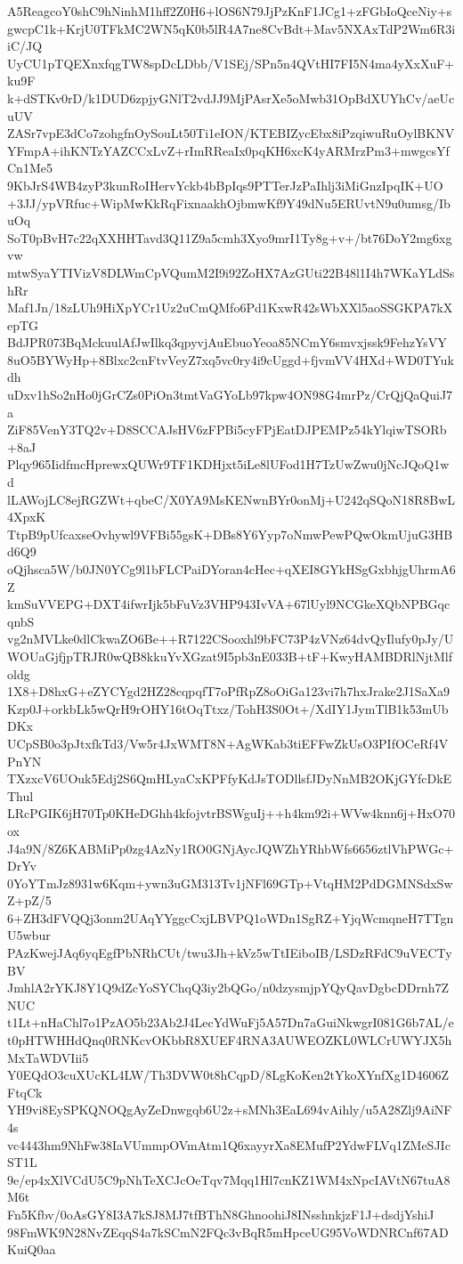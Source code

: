 A5ReagcoY0shC9hNinhM1hff2Z0H6+lOS6N79JjPzKnF1JCg1+zFGbIoQceNiy+s
gwcpC1k+KrjU0TFkMC2WN5qK0b5lR4A7ne8CvBdt+Mav5NXAxTdP2Wm6R3iiC/JQ
UyCU1pTQEXnxfqgTW8spDcLDbb/V1SEj/SPn5n4QVtHI7FI5N4ma4yXxXuF+ku9F
k+dSTKv0rD/k1DUD6zpjyGNlT2vdJJ9MjPAsrXe5oMwb31OpBdXUYhCv/aeUcuUV
ZASr7vpE3dCo7zohgfnOySouLt50Ti1eION/KTEBIZycEbx8iPzqiwuRuOylBKNV
YFmpA+ihKNTzYAZCCxLvZ+rImRReaIx0pqKH6xcK4yARMrzPm3+mwgcsYfCn1Me5
9KbJrS4WB4zyP3kunRoIHervYckb4bBpIqs9PTTerJzPaIhlj3iMiGnzIpqIK+UO
+3JJ/ypVRfuc+WipMwKkRqFixnaakhOjbmwKf9Y49dNu5ERUvtN9u0umsg/IbuOq
SoT0pBvH7c22qXXHHTavd3Q11Z9a5cmh3Xyo9mrI1Ty8g+v+/bt76DoY2mg6xgvw
mtwSyaYTIVizV8DLWmCpVQumM2I9i92ZoHX7AzGUti22B48l1I4h7WKaYLdSshRr
Maf1Jn/18zLUh9HiXpYCr1Uz2uCmQMfo6Pd1KxwR42sWbXXl5aoSSGKPA7kXepTG
BdJPR073BqMckuulAfJwIlkq3qpyvjAuEbuoYeoa85NCmY6smvxjssk9FehzYsVY
8uO5BYWyHp+8Blxc2cnFtvVeyZ7xq5vc0ry4i9cUggd+fjvmVV4HXd+WD0TYukdh
uDxv1hSo2nHo0jGrCZs0PiOn3tmtVaGYoLb97kpw4ON98G4mrPz/CrQjQaQuiJ7a
ZiF85VenY3TQ2v+D8SCCAJsHV6zFPBi5cyFPjEatDJPEMPz54kYlqiwTSORb+8aJ
Plqy965IidfmcHprewxQUWr9TF1KDHjxt5iLe8lUFod1H7TzUwZwu0jNcJQoQ1wd
lLAWojLC8ejRGZWt+qbeC/X0YA9MsKENwnBYr0onMj+U242qSQoN18R8BwL4XpxK
TtpB9pUfcaxseOvhywl9VFBi55gsK+DBs8Y6Yyp7oNmwPewPQwOkmUjuG3HBd6Q9
oQjhsca5W/b0JN0YCg9l1bFLCPaiDYoran4cHec+qXEI8GYkHSgGxbhjgUhrmA6Z
kmSuVVEPG+DXT4ifwrIjk5bFuVz3VHP943IvVA+67lUyl9NCGkeXQbNPBGqcqnbS
vg2nMVLke0dlCkwaZO6Be++R7122CSooxhl9bFC73P4zVNz64dvQyIlufy0pJy/U
WOUaGjfjpTRJR0wQB8kkuYvXGzat9I5pb3nE033B+tF+KwyHAMBDRlNjtMlfoldg
1X8+D8hxG+eZYCYgd2HZ28cqpqfT7oPfRpZ8oOiGa123vi7h7hxJrake2J1SaXa9
Kzp0J+orkbLk5wQrH9rOHY16tOqTtxz/TohH3S0Ot+/XdIY1JymTlB1k53mUbDKx
UCpSB0o3pJtxfkTd3/Vw5r4JxWMT8N+AgWKab3tiEFFwZkUsO3PIfOCeRf4VPnYN
TXzxcV6UOuk5Edj2S6QmHLyaCxKPFfyKdJsTODllsfJDyNnMB2OKjGYfcDkEThul
LRcPGIK6jH70Tp0KHeDGhh4kfojvtrBSWguIj++h4km92i+WVw4knn6j+HxO70ox
J4a9N/8Z6KABMiPp0zg4AzNy1RO0GNjAycJQWZhYRhbWfs6656ztlVhPWGc+DrYv
0YoYTmJz8931w6Kqm+ywn3uGM313Tv1jNFl69GTp+VtqHM2PdDGMNSdxSwZ+pZ/5
6+ZH3dFVQQj3onm2UAqYYggcCxjLBVPQ1oWDn1SgRZ+YjqWcmqneH7TTgnU5wbur
PAzKwejJAq6yqEgfPbNRhCUt/twu3Jh+kVz5wTtIEiboIB/LSDzRFdC9uVECTyBV
JmhlA2rYKJ8Y1Q9dZcYoSYChqQ3iy2bQGo/n0dzysmjpYQyQavDgbcDDrnh7ZNUC
t1Lt+nHaChl7o1PzAO5b23Ab2J4LecYdWuFj5A57Dn7aGuiNkwgrI081G6b7AL/e
t0pHTWHHdQnq0RNKcvOKbbR8XUEF4RNA3AUWEOZKL0WLCrUWYJX5hMxTaWDVIii5
Y0EQdO3cuXUcKL4LW/Th3DVW0t8hCqpD/8LgKoKen2tYkoXYnfXg1D4606ZFtqCk
YH9vi8EySPKQNOQgAyZeDnwgqb6U2z+sMNh3EaL694vAihly/u5A28Zlj9AiNF4s
vc4443hm9NhFw38IaVUmmpOVmAtm1Q6xayyrXa8EMufP2YdwFLVq1ZMeSJIcST1L
9e/ep4xXlVCdU5C9pNhTeXCJcOeTqv7Mqq1Hl7cnKZ1WM4xNpcIAVtN67tuA8M6t
Fn5Kfbv/0oAsGY8I3A7kSJ8MJ7tfBThN8GhnoohiJ8INsshnkjzF1J+dsdjYshiJ
98FmWK9N28NvZEqqS4a7kSCmN2FQc3vBqR5mHpceUG95VoWDNRCnf67ADKuiQ0aa
